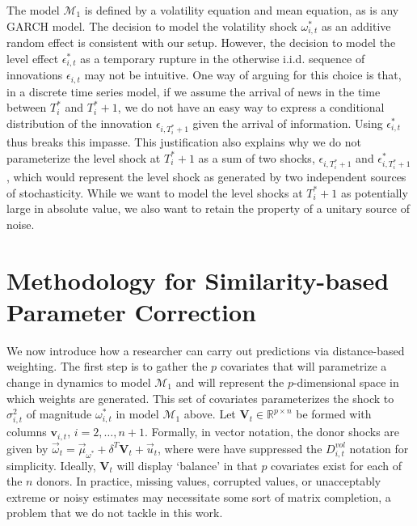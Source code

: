 \documentclass[11pt,3p,review,authoryear]{elsarticle}
\newcommand{\x}{\textbf{v}}
\def\mc#1{\mathcal{#1}} %
\def\mc#1{\mathcal{#1}}
\theoremstyle{definition}
\begin{document}
The model $\mc{M}_1$ is defined by a volatility equation and mean equation, as is any GARCH model.  The decision to model the volatility shock $\omega^{*}_{i,t}$ as an additive random effect is consistent with our setup.  However, the decision to model the level effect $\epsilon^{*}_{i,t}$ as a temporary rupture in the otherwise i.i.d. sequence of innovations $\epsilon_{i,t}$ may not be intuitive.  One way of arguing for this choice is that, in a discrete time series model, if we assume the arrival of news in the time between $T_{i}^{*}$ and $T_{i}^{*}+1$, we do not have an easy way to express a conditional distribution of the innovation $\epsilon_{i,T_{i}^{*}+1}$ given the arrival of information.  Using $\epsilon^{*}_{i,t}$ thus breaks this impasse.  This justification also explains why we do not parameterize the level shock at $T_{i}^{*}+1$ as a sum of two shocks, $\epsilon_{i,T_{i}^{*}+1}$ and $\epsilon^{*}_{i,T_{i}^{*}+1}$, which would represent the level shock as generated by two independent sources of stochasticity. While we want to model the level shocks at $T_{i}^{*}+1$ as potentially large in absolute value, we also want to retain the property of a unitary source of noise.


\section{Methodology for Similarity-based Parameter Correction}

We now introduce how a researcher can carry out predictions via distance-based weighting.  The first step is to gather the $p$ covariates that will parametrize a change in dynamics to model $\mc{M}_1$ and will represent the $p$-dimensional space in which weights are generated.  This set of covariates parameterizes the shock to $\sigma^2_{i,t}$  of magnitude $\omega^*_{i,t}$ in model $\mc{M}_{1}$ above. Let $\textbf{V}_{t} \in \mathbb{R}^{p \times n}$ be formed with columns $\x_{i,t}$, $i = 2,\ldots,n+1$. Formally, in vector notation, the donor shocks are given by $\vec{\omega}_t = \vec{\mu}_{\omega^{*}} + \delta^{T}\textbf{V}_{t} + \vec{u}_{t}$, 
    where were have suppressed the $D^{vol}_{i,t}$ notation for simplicity.  %
    Ideally, $\textbf{V}_{t}$ will display `balance' in that $p$ covariates exist for each of the $n$ donors.  In practice, missing values, corrupted values, or unacceptably extreme or noisy estimates may necessitate some sort of matrix completion, a problem that we do not tackle in this work.  
\end{document}
